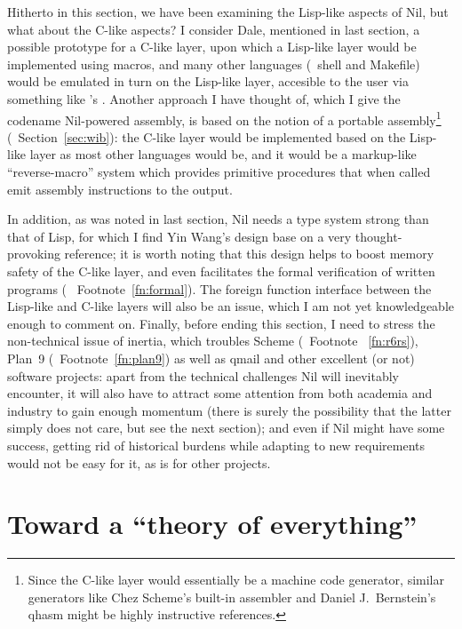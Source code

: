 Hitherto in this section, we have been examining the Lisp-like aspects of Nil,
but what about the C-like aspects?  I consider Dale, mentioned in last section,
a possible prototype for a C-like layer, upon which a Lisp-like layer would
be implemented using macros, and many other languages (\eg~shell and Makefile)
would be emulated in turn on the Lisp-like layer, accesible to the user via
something like 's .  Another approach I
have thought of, which I give the codename Nil-powered assembly, is based on the
notion of a portable assembly\footnote{Since the C-like layer would essentially
be a machine code generator, similar generators like Chez Scheme's built-in
assembler and Daniel J.\ Bernstein's qhasm might be highly instructive
references.} (\cf~Section~\ref{sec:wib}): the C-like layer would be implemented
based on the Lisp-like layer as most other languages would be, and it
would be a markup-like ``reverse-macro'' system which provides primitive
procedures that when called emit assembly instructions to the output.

In addition, as was noted in last section, Nil needs a type system strong than
that of Lisp, for which I find Yin Wang's design base on %
 a very thought-provoking reference; it is
worth noting that this design helps to boost memory safety of the C-like layer,
and even facilitates the formal verification of written programs (\cf~%
Footnote~\ref{fn:formal}).  The foreign function interface between the Lisp-like
and C-like layers will also be an issue, which I am not yet knowledgeable enough
to comment on.  Finally, before ending this section, I need to stress the
non-technical issue of inertia, which troubles Scheme (\cf~Footnote~%
\ref{fn:r6rs}), Plan~9 (\cf~Footnote~\ref{fn:plan9}) as well as qmail and
other excellent (or not) software projects: apart from the technical challenges
Nil will inevitably encounter, it will also have to attract some attention
from both academia and industry to gain enough momentum (there is surely the
possibility that the latter simply does not care, but see the next section); and
even if Nil might have some success, getting rid of historical burdens while
adapting to new requirements would not be easy for it, as is for other projects.

\section{Toward a ``theory of everything''}\label{sec:toe}

